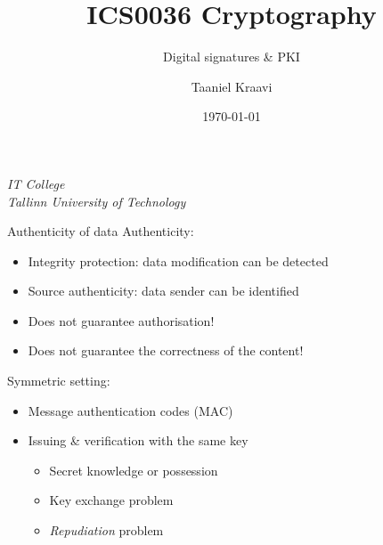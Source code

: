 \graphicspath{ {../../images/} }
\usetikzlibrary{external}

\title{ICS0036 Cryptography}
\subtitle{Digital signatures \& PKI}
\date{\today}
\author{Taaniel Kraavi}
\institute%
{%
  \textit{IT College}\\
  \textit{Tallinn University of Technology}
}


\begin{frame}
  \titlepage
\end{frame}

\begin{frame}{Authenticity of data}
  Authenticity:
  \begin{itemize}[<+(1)->]
    \item Integrity protection: data modification can be detected
    \item Source authenticity: data sender can be identified
    \item Does not guarantee authorisation!
    \item Does not guarantee the correctness of the content!
  \end{itemize}

  \pause
  Symmetric setting:
  \begin{itemize}[<+(1)->]
    \item Message authentication codes (MAC)
    \item Issuing \& verification with the same key
    \begin{itemize}
      \item Secret knowledge or possession
      \item Key exchange problem
      \item \emph{Repudiation} problem
    \end{itemize}
  \end{itemize}
\end{frame}

